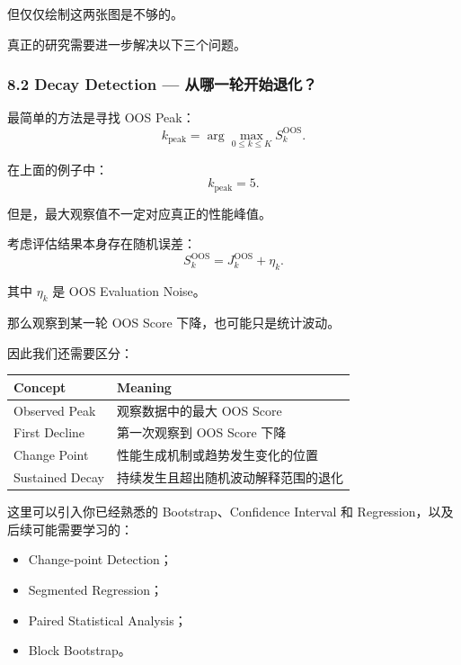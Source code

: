 
但仅仅绘制这两张图是不够的。

真正的研究需要进一步解决以下三个问题。

\hypertarget{part-1-07-0001-decay-detection-ux4eceux54eaux4e00ux8f6eux5f00ux59cbux9000ux5316}{%
\subsubsection{8.2 Decay Detection --- 从哪一轮开始退化？}\label{part-1-07-0001-decay-detection-ux4eceux54eaux4e00ux8f6eux5f00ux59cbux9000ux5316}}

最简单的方法是寻找 OOS Peak：
\[k_{\mathrm{peak}}
=
\arg\max_{0\leq k\leq K}
S_k^{\mathrm{OOS}}.\]

在上面的例子中：
\[k_{\mathrm{peak}}=5.\]

但是，最大观察值不一定对应真正的性能峰值。

考虑评估结果本身存在随机误差：
\[S_k^{\mathrm{OOS}}
=
J_k^{\mathrm{OOS}}+\eta_k.\]

其中 \(\eta_k\) 是 OOS Evaluation Noise。

那么观察到某一轮 OOS Score 下降，也可能只是统计波动。

因此我们还需要区分：

\begin{readertable}
\begin{longtable}[]{@{}
  >{\raggedright\arraybackslash}p{}
  >{\raggedright\arraybackslash}p{}@{}}
\toprule
Concept & Meaning \\
\midrule
\endhead
Observed Peak & 观察数据中的最大 OOS Score \\
First Decline & 第一次观察到 OOS Score 下降 \\
Change Point & 性能生成机制或趋势发生变化的位置 \\
Sustained Decay & 持续发生且超出随机波动解释范围的退化 \\
\bottomrule
\end{longtable}
\end{readertable}

这里可以引入你已经熟悉的 Bootstrap、Confidence Interval 和 Regression，以及后续可能需要学习的：

\begin{itemize}
\tightlist
\item
  Change-point Detection；
\item
  Segmented Regression；
\item
  Paired Statistical Analysis；
\item
  Block Bootstrap。
\end{itemize}

